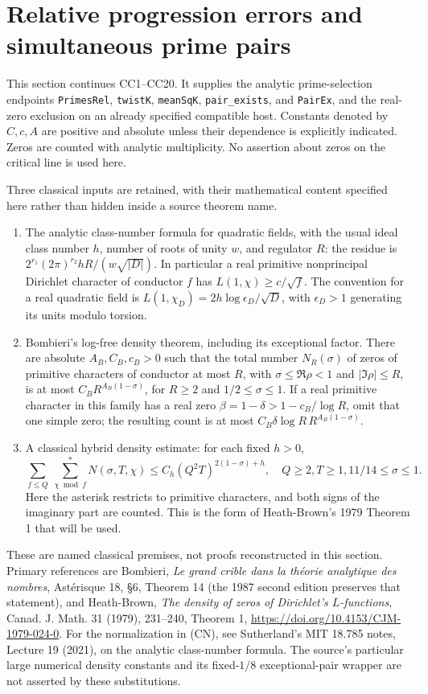 \section{Relative progression errors and simultaneous prime pairs}
\label{sec:simultaneous-prime-pairs}

This section continues CC1--CC20.  It supplies the analytic prime-selection
endpoints \texttt{PrimesRel}, \texttt{twistK}, \texttt{meanSqK},
\texttt{pair\_exists}, and \texttt{PairEx}, and the real-zero exclusion on
an already specified compatible host.  Constants denoted by $C,c,A$ are
positive and absolute unless their dependence is explicitly indicated.
Zeros are counted with analytic multiplicity.  No assertion about zeros
on the critical line is used here.

Three classical inputs are retained, with their mathematical content
specified here rather than hidden inside a source theorem name.
\begin{enumerate}
\item[(CN)] The analytic class-number formula for quadratic fields, with
the usual ideal class number $h$, number of roots of unity $w$, and
regulator $R$: the residue is
$2^{r_1}(2\pi)^{r_2}hR/(w\sqrt{|D|})$.
In particular a real primitive nonprincipal Dirichlet character of
conductor $f$ has $L(1,\chi)\ge c/\sqrt f$.
The convention for a real quadratic field is
$L(1,\chi_D)=2h\log\epsilon_D/\sqrt D$, with $\epsilon_D>1$
generating its units modulo torsion.
\item[(BD)] Bombieri's log-free density theorem, including its exceptional
factor.  There are absolute $A_B,C_B,c_B>0$ such that the total number
$N_R(\sigma)$ of zeros of primitive characters of conductor at most $R$,
with $\sigma\le\Re\rho<1$ and $|\Im\rho|\le R$, is at most
$C_BR^{A_B(1-\sigma)}$, for $R\ge2$ and $1/2\le\sigma\le1$.
If a real primitive character in this family has a real zero
$\beta=1-\delta>1-c_B/\log R$, omit that one simple zero; the resulting
count is at most
$C_B\delta\log R\,R^{A_B(1-\sigma)}$.
\item[(HD)] A classical hybrid density estimate: for each fixed $h>0$,
\[
 \sum_{f\le Q}\ \sum_{\chi\bmod f}^{*}N(\sigma,T,\chi)
       \le C_h(Q^2T)^{2(1-\sigma)+h},
 \quad Q\ge2, T\ge1, 11/14\le\sigma\le1.
\]
Here the asterisk restricts to primitive characters, and both signs of
the imaginary part are counted.  This is the form of Heath-Brown's
1979 Theorem 1 that will be used.
\end{enumerate}
These are named classical premises, not proofs reconstructed in this
section.  Primary references are Bombieri, \emph{Le grand crible dans la
th\'eorie analytique des nombres}, Ast\'erisque 18, \S6, Theorem 14
(the 1987 second edition preserves that statement), and Heath-Brown,
\emph{The density of zeros of Dirichlet's $L$-functions},
Canad. J. Math. 31 (1979), 231--240, Theorem 1,
\url{https://doi.org/10.4153/CJM-1979-024-0}.
For the normalization in (CN), see Sutherland's MIT 18.785 notes,
Lecture 19 (2021), on the analytic class-number formula.
The source's particular large numerical density constants and its
fixed-$1/8$ exceptional-pair wrapper are not asserted by these substitutions.

